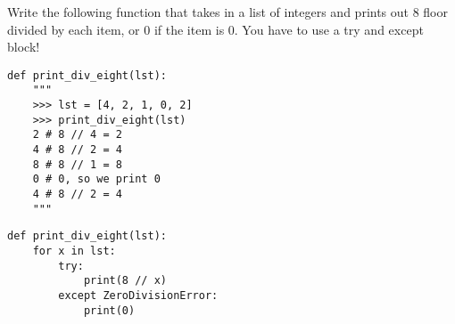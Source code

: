 \begin{blocksection}
\question Write the following function that takes in a list of integers and prints out 8 floor divided by each item, or 0 if the item is 0. You have to use a try and except block!

\begin{lstlisting}
def print_div_eight(lst):
    """
    >>> lst = [4, 2, 1, 0, 2]
    >>> print_div_eight(lst)
    2 # 8 // 4 = 2
    4 # 8 // 2 = 4
    8 # 8 // 1 = 8
    0 # 0, so we print 0
    4 # 8 // 2 = 4
    """
\end{lstlisting}
\begin{solution}[1in]
\begin{lstlisting}
def print_div_eight(lst):
    for x in lst:
    	try:
    		print(8 // x)
    	except ZeroDivisionError:
    		print(0)
\end{lstlisting}
\end{solution}
\end{blocksection}